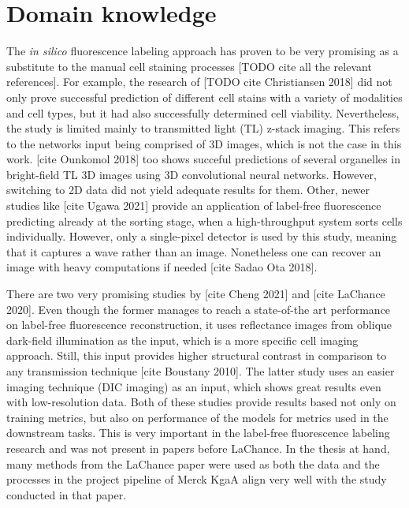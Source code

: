 \section{Domain knowledge}

    The \textit{in silico} fluorescence labeling approach has proven to be very promising as a substitute to the manual cell staining processes [TODO cite all the relevant references]. For example, the research of [TODO cite Christiansen 2018] did not only prove successful prediction of different cell stains with a variety of modalities and cell types, but it had also successfully determined cell viability. Nevertheless, the study is limited mainly to transmitted light (TL) z-stack imaging. This refers to the networks input being comprised of 3D images, which is not the case in this work. [cite Ounkomol 2018] too shows succeful predictions of several organelles in bright-field TL 3D images using 3D convolutional neural networks. However, switching to 2D data did not yield adequate results for them. Other, newer studies like [cite Ugawa 2021] provide an application of label-free fluorescence predicting already at the sorting stage, when a high-throughput system sorts cells individually. However, only a single-pixel detector is used by this study, meaning that it captures a wave rather than an image. Nonetheless one can recover an image with heavy computations if needed [cite Sadao Ota 2018].
    
    There are two very promising studies by [cite Cheng 2021] and [cite LaChance 2020]. Even though the former manages to reach a state-of-the art performance on label-free fluorescence reconstruction, it uses reflectance images from oblique dark-field illumination as the input, which is a more specific cell imaging approach. Still, this input provides higher structural contrast in comparison to any transmission technique [cite Boustany 2010]. The latter study uses an easier imaging technique (DIC imaging) as an input, which shows great results even with low-resolution data. Both of these studies provide results based not only on training metrics, but also on performance of the models for metrics used in the downstream tasks. This is very important in the label-free fluorescence labeling research and was not present in papers before LaChance. In the thesis at hand, many methods from the LaChance paper were used as both the data and the processes in the project pipeline of Merck KgaA align very well with the study conducted in that paper.
    
